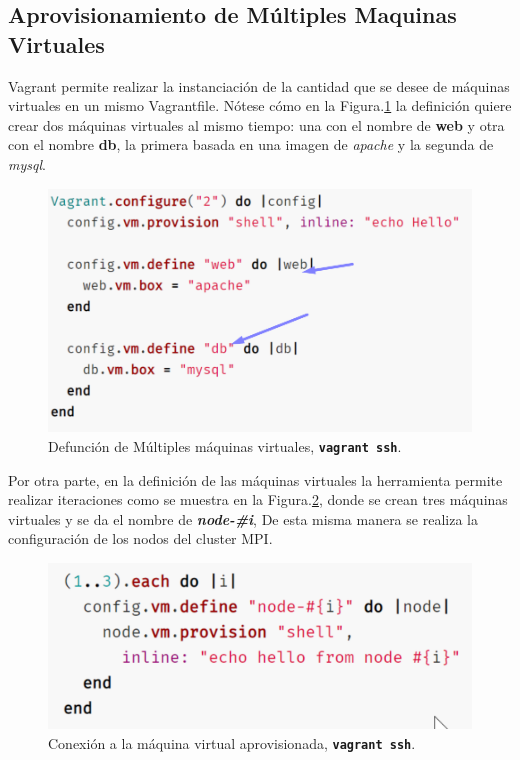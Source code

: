 \documentclass[letterpaper, 12pt, oneside]{article}
\begin{document}
    \subsection{Aprovisionamiento de Múltiples Maquinas Virtuales}
    Vagrant permite realizar la instanciación de la cantidad que se desee de máquinas virtuales en un mismo Vagrantfile. Nótese cómo en la Figura.\ref{fig:provision1} la definición quiere crear dos máquinas virtuales al mismo tiempo: una con el nombre de \textbf{web} y otra con el nombre \textbf{db}, la primera basada en una imagen de \textit{apache} y la segunda de \textit{mysql}.
    \begin{figure}[H]
        \includegraphics[scale=0.9]{img/cluster/multi1.png}
        \caption{Defunción de Múltiples máquinas virtuales, \textbf{\texttt{vagrant ssh}}.}
        \label{fig:provision1}
    \end{figure}
    
    Por otra parte, en la definición de las máquinas virtuales la herramienta permite realizar iteraciones como se muestra en la Figura.\ref{fig:provision2}, donde se crean tres máquinas virtuales y se da el nombre de \textbf{\textit{node-\#i}}, De esta misma manera se realiza la configuración de los nodos del cluster MPI.
    
    \begin{figure}[H]
        \includegraphics[scale=0.8]{img/cluster/multi2.png}
        \caption{Conexión a la máquina virtual aprovisionada, \textbf{\texttt{vagrant ssh}}.}
        \label{fig:provision2}
    \end{figure}
    
\end{document}
